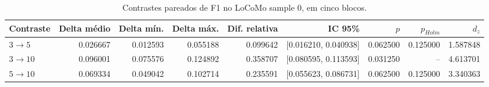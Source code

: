 \begin{table}[htbp]
\centering
\caption{Contrastes pareados de F1 no LoCoMo sample 0, em cinco blocos.}
\label{tab:entrega3-contrastes}
\begin{tabular}{lrrrrrrrr}
\hline
Contraste & Delta médio & Delta mín. & Delta máx. & Dif. relativa & IC 95\% & $p$ & $p_{Holm}$ & $d_z$ \\
\hline
$3 \to 5$ & 0.026667 & 0.012593 & 0.055188 & 0.099642 & [0.016210, 0.040938] & 0.062500 & 0.125000 & 1.587848 \\
$3 \to 10$ & 0.096001 & 0.075576 & 0.124892 & 0.358707 & [0.080595, 0.113593] & 0.031250 & -- & 4.613701 \\
$5 \to 10$ & 0.069334 & 0.049042 & 0.102714 & 0.235591 & [0.055623, 0.086731] & 0.062500 & 0.125000 & 3.340363 \\
\hline
\end{tabular}
\end{table}
